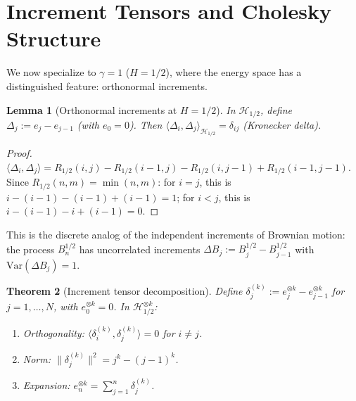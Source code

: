\documentclass[11pt,a4paper]{article}
\theoremstyle{plain}
\newtheorem{theorem}{Theorem}[section]
\newtheorem{lemma}[theorem]{Lemma}
\theoremstyle{definition}
\theoremstyle{remark}
\newcommand{\Var}{\mathrm{Var}}
\begin{document}
\section{Increment Tensors and Cholesky Structure}
\label{sec:increment}

We now specialize to $\gamma = 1$ ($H = 1/2$),
where the energy space has a distinguished feature:
orthonormal increments.

\begin{lemma}[Orthonormal increments at $H = 1/2$]
\label{lem:increments}
In $\mathcal{H}_{1/2}$, define $\Delta_j := e_j - e_{j-1}$
(with $e_0 = 0$).  Then
$\langle \Delta_i, \Delta_j \rangle_{\mathcal{H}_{1/2}}
= \delta_{ij}$ (Kronecker delta).
\end{lemma}

\begin{proof}
$\langle \Delta_i, \Delta_j \rangle
= R_{1/2}(i,j) - R_{1/2}(i-1,j) - R_{1/2}(i,j-1)
+ R_{1/2}(i-1,j-1)$.
Since $R_{1/2}(n,m) = \min(n,m)$:
for $i = j$, this is $i - (i{-}1) - (i{-}1) + (i{-}1) = 1$;
for $i < j$, this is $i - (i{-}1) - i + (i{-}1) = 0$.
\end{proof}

This is the discrete analog of the independent increments
of Brownian motion: the process $B_n^{1/2}$ has
uncorrelated increments
$\Delta B_j := B_j^{1/2} - B_{j-1}^{1/2}$
with $\Var(\Delta B_j) = 1$.

\begin{theorem}[Increment tensor decomposition]
\label{thm:increment}
Define $\delta_j^{(k)} := e_j^{\otimes k}
- e_{j-1}^{\otimes k}$ for $j = 1,\ldots,N$,
with $e_0^{\otimes k} = 0$.  In
$\mathcal{H}_{1/2}^{\otimes k}$:
\begin{enumerate}[label=\textup{(\roman*)}]
\item \textup{Orthogonality:}
  $\langle \delta_i^{(k)}, \delta_j^{(k)} \rangle = 0$
  for $i \neq j$.
\item \textup{Norm:}
  $\|\delta_j^{(k)}\|^2 = j^k - (j{-}1)^k$.
\item \textup{Expansion:}
  $e_n^{\otimes k} = \sum_{j=1}^n \delta_j^{(k)}$.
\end{enumerate}
\end{theorem}
\end{document}
